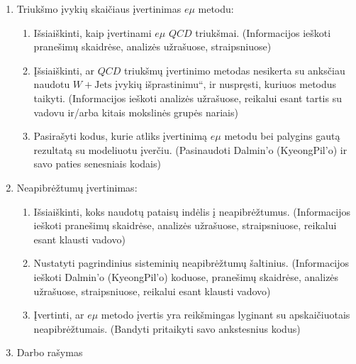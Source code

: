 \documentclass[a4paper, 12pt]{article}
\newcommand{\emu}{e\mu}
\newcommand{\ltq}[1]{{\quotedblbase{}#1\textquotedblleft{}}}
\begin{document}
\begin{enumerate}
	\item Triukšmo įvykių skaičiaus įvertinimas $e\mu$ metodu:
	\begin{enumerate}
		\item Išsiaiškinti, kaip įvertinami $e\mu$ $QCD$ triukšmai.
		(Informacijos ieškoti pranešimų skaidrėse, analizės užrašuose, straipsniuose)
		\item Įšsiaiškinti, ar $QCD$ triukšmų įvertinimo metodas nesikerta su anksčiau naudotu
		$W+\mathrm{Jets}$ įvykių \ltq{išprastinimu}, ir nuspręsti, kuriuos metodus taikyti.
		(Informacijos ieškoti analizės užrašuose, reikalui esant tartis su vadovu ir/arba kitais
		mokslinės grupės nariais)
		\item Pasirašyti kodus, kurie atliks įvertinimą $e\mu$ metodu bei palygins gautą rezultatą
		su modeliuotu įverčiu. (Pasinaudoti Dalmin'o (KyeongPil'o) ir savo paties senesniais kodais)
	\end{enumerate}
	
	\item Neapibrėžtumų įvertinimas:
	\begin{enumerate}
		\item Išsiaiškinti, koks naudotų pataisų indėlis į neapibrėžtumus. (Informacijos ieškoti
		pranešimų skaidrėse, analizės užrašuose, straipsniuose, reikalui esant klausti vadovo)
		\item Nustatyti pagrindinius sisteminių neapibrėžtumų šaltinius. (Informacijos ieškoti
		Dalmin'o (KyeongPil'o) koduose, pranešimų skaidrėse, analizės užrašuose, straipsniuose, reikalui
		esant klausti vadovo)
		\item Įvertinti, ar $\emu$ metodo įvertis yra reikšmingas lyginant su apskaičiuotais
		neapibrėžtumais. (Bandyti pritaikyti savo ankstesnius kodus)
	\end{enumerate}
	
	\item Darbo rašymas
\end{enumerate}
\end{document}
